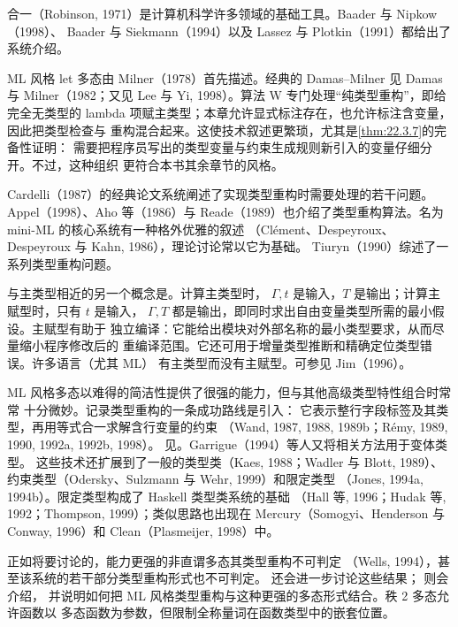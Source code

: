 合一（Robinson, 1971）是计算机科学许多领域的基础工具。Baader 与 Nipkow（1998）、
Baader 与 Siekmann（1994）以及 Lassez 与 Plotkin（1991）都给出了系统介绍。

ML 风格 let 多态由 Milner（1978）首先描述。经典的 Damas--Milner
见 Damas 与 Milner（1982；又见 Lee 与 Yi, 1998）。算法 W 专门处理“纯类型重构”，即给完全无类型的
lambda 项赋主类型；本章允许显式标注存在，也允许标注含变量，因此把类型检查与
重构混合起来。这使技术叙述更繁琐，尤其是\cref{thm:22.3.7}的完备性证明：
需要把程序员写出的类型变量与约束生成规则新引入的变量仔细分开。不过，这种组织
更符合本书其余章节的风格。

Cardelli（1987）的经典论文系统阐述了实现类型重构时需要处理的若干问题。Appel（1998）、Aho 等（1986）与
Reade（1989）也介绍了类型重构算法。名为 mini-ML 的核心系统有一种格外优雅的叙述
（Clément、Despeyroux、Despeyroux 与 Kahn, 1986），理论讨论常以它为基础。
Tiuryn（1990）综述了一系列类型重构问题。

与主类型相近的另一个概念是。计算主类型时，
\(\Gamma,t\) 是输入，\(T\) 是输出；计算主赋型时，只有 \(t\) 是输入，
\(\Gamma,T\) 都是输出，即同时求出自由变量类型所需的最小假设。主赋型有助于
独立编译：它能给出模块对外部名称的最小类型要求，从而尽量缩小程序修改后的
重编译范围。它还可用于增量类型推断和精确定位类型错误。许多语言（尤其 ML）
有主类型而没有主赋型。可参见 Jim（1996）。

ML 风格多态以难得的简洁性提供了很强的能力，但与其他高级类型特性组合时常常
十分微妙。记录类型重构的一条成功路线是引入：
它表示整行字段标签及其类型，再用等式合一求解含行变量的约束
（Wand, 1987, 1988, 1989b；Rémy, 1989, 1990, 1992a, 1992b, 1998）。
见。Garrigue（1994）等人又将相关方法用于变体类型。
这些技术还扩展到了一般的类型类（Kaes, 1988；Wadler 与 Blott, 1989）、
约束类型（Odersky、Sulzmann 与 Wehr, 1999）和限定类型
（Jones, 1994a, 1994b）。限定类型构成了 Haskell 类型类系统的基础
（Hall 等, 1996；Hudak 等, 1992；Thompson, 1999）；类似思路也出现在
Mercury（Somogyi、Henderson 与 Conway, 1996）和 Clean（Plasmeijer, 1998）中。

正如将要讨论的，能力更强的非直谓多态其类型重构不可判定
（Wells, 1994），甚至该系统的若干部分类型重构形式也不可判定。
还会进一步讨论这些结果；
则会介绍，
并说明如何把 ML 风格类型重构与这种更强的多态形式结合。秩 2 多态允许函数以
多态函数为参数，但限制全称量词在函数类型中的嵌套位置。

